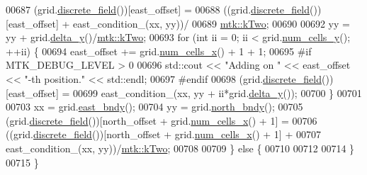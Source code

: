 \begin{DoxyCode}
00687     (grid.\hyperlink{classmtk_1_1UniStgGrid2D_a3e72d59843a3f9c5e47da07e5850dfe0}{discrete\_field}())[east\_offset] =
00688       ((grid.\hyperlink{classmtk_1_1UniStgGrid2D_a3e72d59843a3f9c5e47da07e5850dfe0}{discrete\_field}())[east\_offset] + east\_condition\_(xx, yy))/
00689         \hyperlink{group__c01-roots_gaf39c2d851a2db744f4feb1c5ab3ec2cf}{mtk::kTwo};
00690 
00692     yy = yy + grid.\hyperlink{classmtk_1_1UniStgGrid2D_a65a78cfc80ffdbeb282ed57af4dc5cb4}{delta\_y}()/\hyperlink{group__c01-roots_gaf39c2d851a2db744f4feb1c5ab3ec2cf}{mtk::kTwo};
00693     \textcolor{keywordflow}{for} (\textcolor{keywordtype}{int} ii = 0; ii < grid.\hyperlink{classmtk_1_1UniStgGrid2D_aed05a801cc9a76dba0ff203cea58a61a}{num\_cells\_y}(); ++ii) \{
00694       east\_offset += grid.\hyperlink{classmtk_1_1UniStgGrid2D_a2d182866a398aba8e4829590e85bf939}{num\_cells\_x}() + 1 + 1;
00695 \textcolor{preprocessor}{      #if MTK\_DEBUG\_LEVEL > 0}
00696       std::cout << \textcolor{stringliteral}{"Adding on "} << east\_offset << \textcolor{stringliteral}{"-th position."} << std::endl;
00697 \textcolor{preprocessor}{      #endif}
00698       (grid.\hyperlink{classmtk_1_1UniStgGrid2D_a3e72d59843a3f9c5e47da07e5850dfe0}{discrete\_field}())[east\_offset] =
00699         east\_condition\_(xx, yy + ii*grid.\hyperlink{classmtk_1_1UniStgGrid2D_a65a78cfc80ffdbeb282ed57af4dc5cb4}{delta\_y}());
00700     \}
00701 
00703     xx = grid.\hyperlink{classmtk_1_1UniStgGrid2D_a03f689eb29a6369b82ce1207c655d5ff}{east\_bndy}();
00704     yy = grid.\hyperlink{classmtk_1_1UniStgGrid2D_afe1ead253cdeb5503e0489eba8fd84e2}{north\_bndy}();
00705     (grid.\hyperlink{classmtk_1_1UniStgGrid2D_a3e72d59843a3f9c5e47da07e5850dfe0}{discrete\_field}())[north\_offset + grid.\hyperlink{classmtk_1_1UniStgGrid2D_a2d182866a398aba8e4829590e85bf939}{num\_cells\_x}() + 1] =
00706       ((grid.\hyperlink{classmtk_1_1UniStgGrid2D_a3e72d59843a3f9c5e47da07e5850dfe0}{discrete\_field}())[north\_offset + grid.\hyperlink{classmtk_1_1UniStgGrid2D_a2d182866a398aba8e4829590e85bf939}{num\_cells\_x}() + 1] +
00707       east\_condition\_(xx, yy))/\hyperlink{group__c01-roots_gaf39c2d851a2db744f4feb1c5ab3ec2cf}{mtk::kTwo};
00708 
00709   \} \textcolor{keywordflow}{else} \{
00710 
00712 
00714   \}
00715 \}
\end{DoxyCode}
